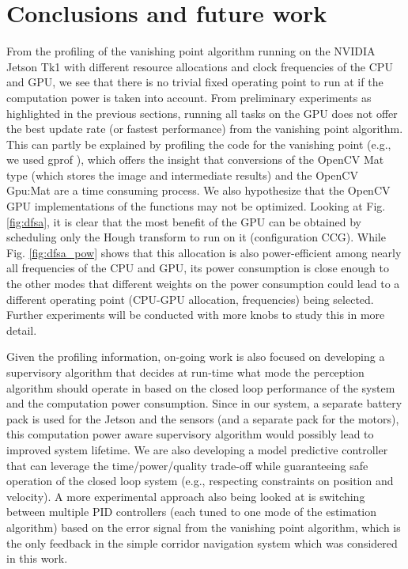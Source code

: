 \section{Conclusions and future work}

From the profiling of the vanishing point algorithm running on the NVIDIA Jetson Tk1 with different resource allocations and clock frequencies of the CPU and GPU, we see that there is no trivial fixed operating point to run at if the computation power is taken into account. 
From preliminary experiments as highlighted in the previous sections, running all tasks on the GPU does not offer the best update rate (or fastest performance) from the vanishing point algorithm. This can partly be explained by profiling the code for the vanishing point (e.g., we used gprof \cite{Graham:1982:GCG:800230.806987}), which offers the insight that conversions of the OpenCV Mat type (which stores the image and intermediate results) and the OpenCV Gpu:Mat are a time consuming process. 
We also hypothesize that the OpenCV GPU implementations of the functions may not be optimized. 
Looking at Fig. \ref{fig:dfsa}, it is clear that the most benefit of the GPU can be obtained by scheduling only the Hough transform to run on it (configuration CCG). 
While Fig. \ref{fig:dfsa_pow} shows that this allocation is also power-efficient among nearly all frequencies of the CPU and GPU, its power consumption is close enough to the other modes that different weights on the power consumption could lead to a different operating point (CPU-GPU allocation, frequencies) being selected. 
Further experiments will be conducted with more knobs to study this in more detail.

Given the profiling information, on-going work is also focused on developing a supervisory algorithm that decides at run-time what mode the perception algorithm should operate in based on the closed loop performance of the system and the computation power consumption. Since in our system, a separate battery pack is used for the Jetson and the sensors (and a separate pack for the motors), this computation power aware supervisory algorithm would possibly lead to improved system lifetime. We are also developing a model predictive controller that can leverage the time/power/quality trade-off while guaranteeing safe operation of the closed loop system (e.g., respecting constraints on position and velocity). A more experimental approach also being looked at is switching between multiple PID controllers (each tuned to one mode of the estimation algorithm) based on the error signal from the vanishing point algorithm, which is the only feedback in the simple corridor navigation system which was considered in this work.
